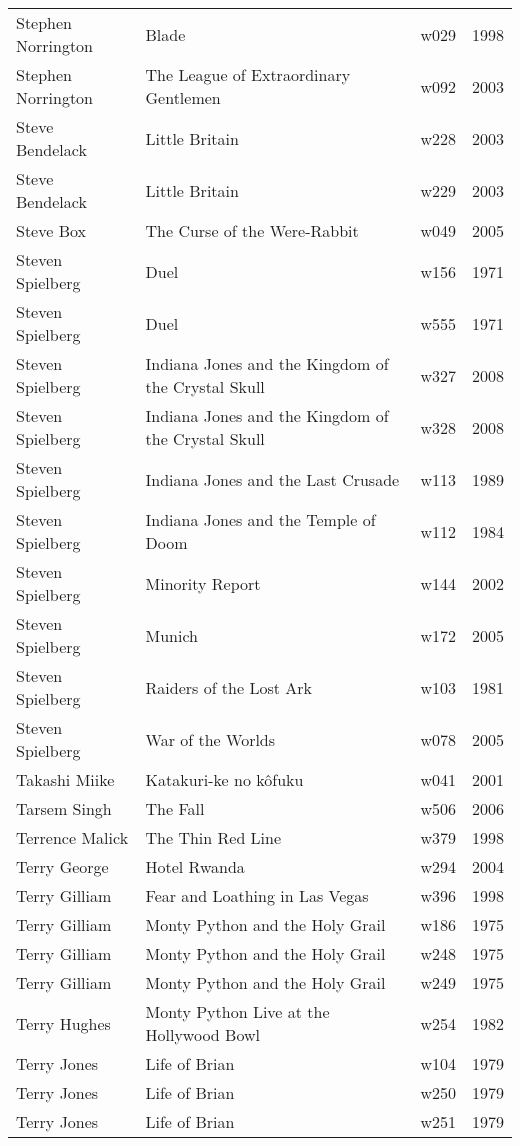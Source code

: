\documentclass{article}
\begin{document}
\begin {center}
\begin{longtable}{l p{10cm} l l}
Stephen Norrington & Blade & w029 & 1998 \\
Stephen Norrington & The League of Extraordinary Gentlemen & w092 & 2003 \\
Steve Bendelack & Little Britain & w228 & 2003 \\
Steve Bendelack & Little Britain & w229 & 2003 \\
Steve Box & The Curse of the Were-Rabbit & w049 & 2005 \\
Steven Spielberg & Duel & w156 & 1971 \\
Steven Spielberg & Duel & w555 & 1971 \\
Steven Spielberg & Indiana Jones and the Kingdom of the Crystal Skull & w327 & 2008 \\
Steven Spielberg & Indiana Jones and the Kingdom of the Crystal Skull & w328 & 2008 \\
Steven Spielberg & Indiana Jones and the Last Crusade & w113 & 1989 \\
Steven Spielberg & Indiana Jones and the Temple of Doom & w112 & 1984 \\
Steven Spielberg & Minority Report & w144 & 2002 \\
Steven Spielberg & Munich & w172 & 2005 \\
Steven Spielberg & Raiders of the Lost Ark & w103 & 1981 \\
Steven Spielberg & War of the Worlds & w078 & 2005 \\
Takashi Miike & Katakuri-ke no kôfuku & w041 & 2001 \\
Tarsem Singh & The Fall & w506 & 2006 \\
Terrence Malick & The Thin Red Line & w379 & 1998 \\
Terry George & Hotel Rwanda & w294 & 2004 \\
Terry Gilliam & Fear and Loathing in Las Vegas & w396 & 1998 \\
Terry Gilliam & Monty Python and the Holy Grail & w186 & 1975 \\
Terry Gilliam & Monty Python and the Holy Grail & w248 & 1975 \\
Terry Gilliam & Monty Python and the Holy Grail & w249 & 1975 \\
Terry Hughes & Monty Python Live at the Hollywood Bowl & w254 & 1982 \\
Terry Jones & Life of Brian & w104 & 1979 \\
Terry Jones & Life of Brian & w250 & 1979 \\
Terry Jones & Life of Brian & w251 & 1979 \\

\end{longtable}
\end{center}
\end{document}
